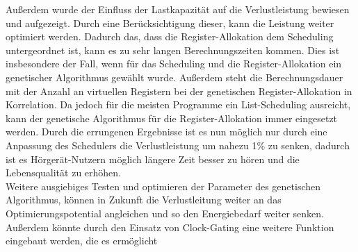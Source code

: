 Außerdem wurde der Einfluss der Lastkapazität auf die Verlustleistung bewiesen und aufgezeigt. Durch eine Berücksichtigung dieser, kann die Leistung weiter optimiert werden.
Dadurch das, dass die Register-Allokation dem Scheduling untergeordnet ist, kann es zu sehr langen Berechnungszeiten kommen. Dies ist insbesondere der Fall, wenn für das Scheduling und die Register-Allokation ein genetischer Algorithmus gewählt wurde. Außerdem steht die Berechnungsdauer mit der Anzahl an virtuellen Registern bei der genetischen Register-Allokation in Korrelation. Da jedoch für die meisten Programme ein List-Scheduling ausreicht, kann der genetische Algorithmus für die Register-Allokation immer eingesetzt werden.
Durch die errungenen Ergebnisse ist es nun möglich nur durch eine Anpassung des Schedulers die Verlustleistung um nahezu 1\% zu senken, dadurch ist es Hörgerät-Nutzern möglich längere Zeit besser zu hören und die Lebensqualität zu erhöhen.\\
Weitere ausgiebiges Testen und optimieren der Parameter des genetischen Algorithmus, können in Zukunft die Verlustleitung weiter an das Optimierungspotential angleichen und so den Energiebedarf weiter senken. Außerdem könnte durch den Einsatz von Clock-Gating eine weitere Funktion eingebaut werden, die es ermöglicht 

%


